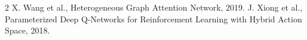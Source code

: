 \documentclass[journal]{IEEEtran}
\begin{document}
\setcounter{section}{3}
\setcounter{equation}{32}
\setcounter{figure}{1}

\begin{thebibliography}{2}
 X. Wang et al., Heterogeneous Graph Attention Network, 2019.
 J. Xiong et al., Parameterized Deep Q-Networks for Reinforcement Learning with Hybrid Action Space, 2018.
\end{thebibliography}
\end{document}
